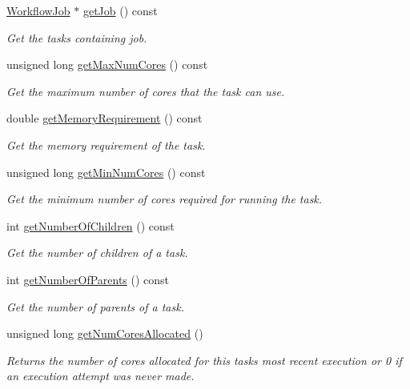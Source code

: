 \begin{DoxyCompactItemize}
\hyperlink{classwrench_1_1_workflow_job}{Workflow\+Job} $\ast$ \hyperlink{classwrench_1_1_workflow_task_aa49cf3afae40d6dcf7394cd94fd4918f}{get\+Job} () const
\begin{DoxyCompactList}\small\item\em Get the task\textquotesingle{}s containing job. \end{DoxyCompactList}\item 
unsigned long \hyperlink{classwrench_1_1_workflow_task_aa470fe4c0a34211165989afabcba795f}{get\+Max\+Num\+Cores} () const
\begin{DoxyCompactList}\small\item\em Get the maximum number of cores that the task can use. \end{DoxyCompactList}\item 
double \hyperlink{classwrench_1_1_workflow_task_aeafc6e6f0bce5853a3fd1e4818638908}{get\+Memory\+Requirement} () const
\begin{DoxyCompactList}\small\item\em Get the memory requirement of the task. \end{DoxyCompactList}\item 
unsigned long \hyperlink{classwrench_1_1_workflow_task_a05d06d1988745735016dcf19d38e2398}{get\+Min\+Num\+Cores} () const
\begin{DoxyCompactList}\small\item\em Get the minimum number of cores required for running the task. \end{DoxyCompactList}\item 
int \hyperlink{classwrench_1_1_workflow_task_a6d69d3c969a5cb32a3a53ec20fb6f6cb}{get\+Number\+Of\+Children} () const
\begin{DoxyCompactList}\small\item\em Get the number of children of a task. \end{DoxyCompactList}\item 
int \hyperlink{classwrench_1_1_workflow_task_ab0c0bc84347585a8ea8ca45251931304}{get\+Number\+Of\+Parents} () const
\begin{DoxyCompactList}\small\item\em Get the number of parents of a task. \end{DoxyCompactList}\item 
unsigned long \hyperlink{classwrench_1_1_workflow_task_a0c897ccd9bf60ae8e30ad28d99e573f9}{get\+Num\+Cores\+Allocated} ()
\begin{DoxyCompactList}\small\item\em Returns the number of cores allocated for this task\textquotesingle{}s most recent execution or 0 if an execution attempt was never made. \end{DoxyCompactList}\item 

\end{DoxyCompactItemize}
